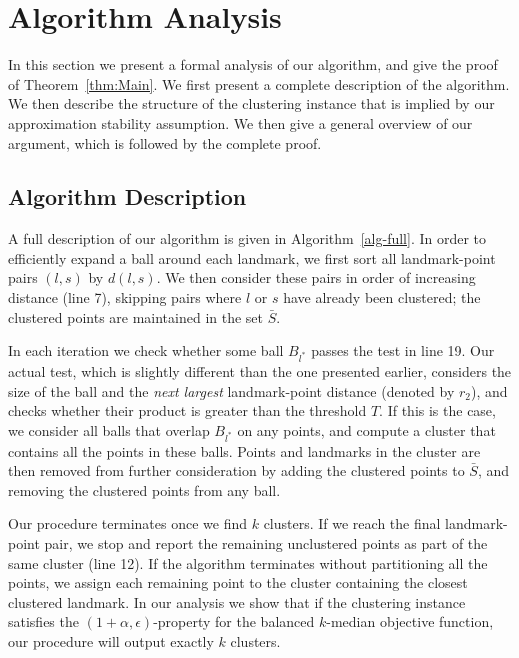 \documentclass{llncs} \usepackage{algorithm}
\begin{document}
\section{Algorithm Analysis}

In this section we present a formal analysis of our algorithm, and give the proof of Theorem~\ref{thm:Main}.  We first present a complete description of the algorithm.  We then describe the structure of the clustering instance that is implied by our approximation stability assumption.  We then give a general overview of our argument, which is followed by the complete proof.

\subsection{Algorithm Description}

A full description of our algorithm is given in Algorithm~\ref{alg-full}.  In order to efficiently expand a ball around each landmark, we first sort all landmark-point pairs $(l,s)$ by $d(l,s)$.  We then consider these pairs in order of increasing distance (line 7), skipping pairs where $l$ or $s$ have already been clustered; the clustered points are maintained in the set $\bar{S}$.

In each iteration we check whether some ball $B_{l^{\ast}}$ passes the test in line 19.  Our actual test, which is slightly different than the one presented earlier, considers the size of the ball and the \emph{next largest} landmark-point distance (denoted by $r_{2}$), and checks whether their product is greater than the threshold $T$.  If this is the case, we consider all balls that overlap $B_{l^{\ast}}$ on any points, and compute a cluster that contains all the points in these balls.  Points and landmarks in the cluster are then removed from further consideration by adding the clustered points to $\bar{S}$, and removing the clustered points from any ball.

Our procedure terminates once we find $k$ clusters.  If we reach the final landmark-point pair, we stop and report the remaining unclustered points as part of the same cluster (line 12).  If the algorithm terminates without partitioning all the points, we assign each remaining point to the cluster containing the closest clustered landmark.  In our analysis we show that if the clustering instance satisfies the $(1+\alpha,\epsilon)$-property for the balanced $k$-median objective function, our procedure will output exactly $k$ clusters.
\end{document}
